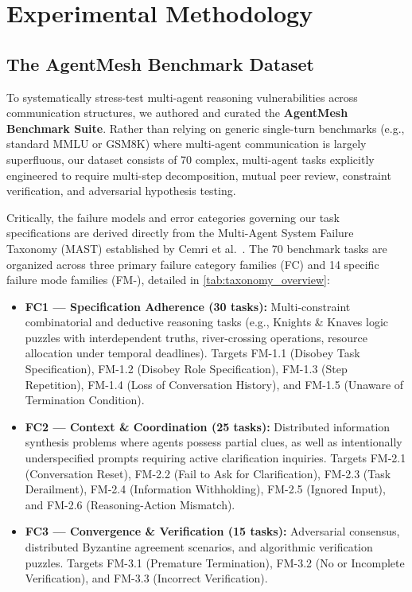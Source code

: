 \documentclass[conference]{IEEEtran}
\newcommand{\fm}[1]{\textsf{FM-#1}} %
\newcommand{\fc}[1]{\textsf{FC#1}}  %
\begin{document}
\section{Experimental Methodology}
\label{sec:methodology}

\subsection{The AgentMesh Benchmark Dataset}
\label{sec:dataset}

To systematically stress-test multi-agent reasoning vulnerabilities across communication structures, we authored and curated the \textbf{AgentMesh Benchmark Suite}. Rather than relying on generic single-turn benchmarks (e.g., standard MMLU or GSM8K) where multi-agent communication is largely superfluous, our dataset consists of 70 complex, multi-agent tasks explicitly engineered to require multi-step decomposition, mutual peer review, constraint verification, and adversarial hypothesis testing.

Critically, the failure models and error categories governing our task specifications are derived directly from the Multi-Agent System Failure Taxonomy (MAST) established by Cemri et al.~\cite{cemri2025why}. The 70 benchmark tasks are organized across three primary failure category families (\fc{}) and 14 specific failure mode families (\fm{}), detailed in \cref{tab:taxonomy_overview}:

\begin{itemize}[leftmargin=1.5em]
  \item \textbf{\fc{1} — Specification Adherence (30 tasks):} Multi-constraint combinatorial and deductive reasoning tasks (e.g., Knights \& Knaves logic puzzles with interdependent truths, river-crossing operations, resource allocation under temporal deadlines). Targets \fm{1.1} (Disobey Task Specification), \fm{1.2} (Disobey Role Specification), \fm{1.3} (Step Repetition), \fm{1.4} (Loss of Conversation History), and \fm{1.5} (Unaware of Termination Condition).
  \item \textbf{\fc{2} — Context \& Coordination (25 tasks):} Distributed information synthesis problems where agents possess partial clues, as well as intentionally underspecified prompts requiring active clarification inquiries. Targets \fm{2.1} (Conversation Reset), \fm{2.2} (Fail to Ask for Clarification), \fm{2.3} (Task Derailment), \fm{2.4} (Information Withholding), \fm{2.5} (Ignored Input), and \fm{2.6} (Reasoning-Action Mismatch).
  \item \textbf{\fc{3} — Convergence \& Verification (15 tasks):} Adversarial consensus, distributed Byzantine agreement scenarios, and algorithmic verification puzzles. Targets \fm{3.1} (Premature Termination), \fm{3.2} (No or Incomplete Verification), and \fm{3.3} (Incorrect Verification).
\end{itemize}
\end{document}
